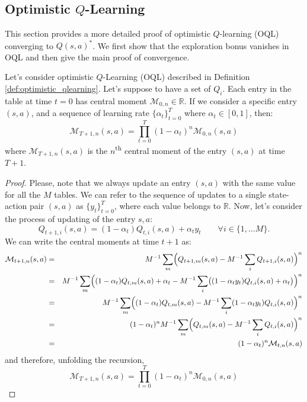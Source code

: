\subsection{Optimistic $Q$-Learning}
This section provides a more detailed proof of optimistic $Q$-learning (OQL) converging to $Q(s,a)^*$.
We first show that the exploration bonus vanishes in OQL and then give the main proof of convergence.
\begin{theorem}
	Let's consider optimistic $Q$-Learning (OQL) described in Definition \ref{def:optimistic_qlearning}. Let's suppose to have a set of $Q_i$. Each entry in the table at time $t=0$ has central moment $\mathcal{M}_{0,n} \in \mathbb{R}$. If we consider a specific entry $(s,a)$, and a sequence of learning rate $\{\alpha_t\}_{t=0}^T$ where $\alpha_t \in [0,1]$, then:
	\begin{equation}
	\mathcal{M}_{T+1,n}(s,a) = \prod_{t=0}^T(1-\alpha_t)^n\mathcal{M}_{0,n}(s,a)
	\end{equation}
	where $\mathcal{M}_{T+1,n}(s,a)$ is the $n$\textsuperscript{th} central moment of the entry $(s,a)$ at time $T+1$.
	\begin{proof}
		Please, note that we always update an entry $(s,a)$ with the same value for all the $M$ tables. We can refer to the sequence of updates to a single state-action pair $(s,a)$ as $\{y_t\}_{t=0}^T$, where each value belongs to $\mathbb{R}$. Now, let's consider the process of updating of the entry $s,a$:
		\begin{equation}
		Q_{t+1,i}(s,a) = (1-\alpha_t)Q_{t,i}(s,a) + \alpha_t y_t \quad \quad \forall i \in \{1,\dots M\}.
		\end{equation}
		We can write the central moments at time $t+1$ as:
		\begin{eqnarray}
		\mathcal{M}_{t+1,n}(s,a)& =& M^{-1} \sum_m \Bigl(Q_{t+1, m}(s,a) - M^{-1} \sum_i Q_{t+1,i}(s,a) \Bigr)^n \nonumber \\
		& =& M^{-1} \sum_m \Bigl((1-\alpha_t)Q_{t, m}(s,a) + \alpha_t - M^{-1} \sum_i \bigl((1-\alpha_t y_t) Q_{t,i}(s,a) + \alpha_t \bigr)\Bigr)^n \nonumber \\ 
		& =& M^{-1} \sum_m \Bigl((1-\alpha_t)Q_{t, m}(s,a)  - M^{-1} \sum_i (1-\alpha_t y_t) Q_{t,i}(s,a) \Bigr)^n \nonumber \\
		& =& (1-\alpha_t)^n M^{-1} \sum_m \Bigl(Q_{t, m}(s,a)  - M^{-1} \sum_i  Q_{t,i}(s,a) \Bigr)^n \nonumber \\
		& =& (1-\alpha_t)^n \mathcal{M}_{t,n}(s,a) \nonumber 
		\end{eqnarray}
		and therefore, unfolding the recursion, 
		\begin{equation}
		\mathcal{M}_{T+1,n}(s,a) = \prod_{t=0}^T(1-\alpha_t)^n\mathcal{M}_{0,n}(s,a) \nonumber
		\end{equation}
	\end{proof}
\end{theorem}


